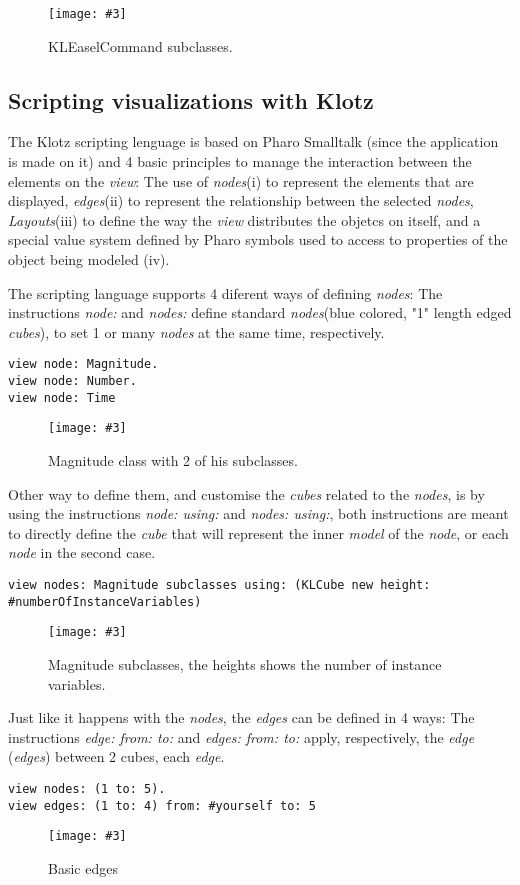 \documentclass[runningheads]{llncs}
\newcommand{\fig}[4]{
	\begin{figure}[#1]
		\centering
		\texttt{[image: \#3]}
		\caption{\label{fig:#3}#4}
	\end{figure}}
\newcommand{\seclabel}[1]{\label{sec:#1}}
\begin{document}
\fig{}{0.5}{figure1.png}{KLEaselCommand subclasses.}


\subsection{Scripting visualizations with Klotz} \seclabel{scripting}
The Klotz scripting lenguage is based on Pharo Smalltalk
(since the application is made on it) and 4 basic principles
to manage the interaction between the elements on the \emph{view}:
The use of \emph{nodes}(i) to represent the elements that are
displayed, \emph{edges}(ii) to represent the relationship between
the selected \emph{nodes}, \emph{Layouts}(iii) to define the way the
\emph{view} distributes the objetcs on itself, and a special value
system defined by Pharo symbols used to access to properties of
the object being modeled (iv).  

The scripting language supports 4 diferent ways of defining \emph{nodes}:
The instructions \emph{node:} and \emph{nodes:} define standard 
\emph{nodes}(blue colored, "1" length edged \emph{cubes}), to set 1 or many 
\emph{nodes} at the same time, respectively.
\begin{lstlisting}
view node: Magnitude.
view node: Number.
view node: Time    
\end{lstlisting}
\fig{}{0.3}{figure2.png}{Magnitude class with 2 of his subclasses.}
Other way to define them, and customise the \emph{cubes} related to the 
\emph{nodes}, is by using the instructions \emph{node: using:} and 
\emph{nodes: using:}, both instructions are meant to directly define 
the \emph{cube} that will represent the inner \emph{model} of the \emph{node}, 
or each \emph{node} in the second case.
\begin{lstlisting}
view nodes: Magnitude subclasses using: (KLCube new height: #numberOfInstanceVariables)    
\end{lstlisting}
\fig{}{0.5}{figure3.png}{Magnitude subclasses, the heights shows the number of instance variables.}

Just like it happens with the \emph{nodes}, the \emph{edges} can be defined in 
4 ways: The instructions \emph{edge: from: to:} and \emph{edges: from: to:} 
apply, respectively, the \emph{edge} (\emph{edges}) between 2 cubes, each \emph{edge}.
\begin{lstlisting}
view nodes: (1 to: 5).	
view edges: (1 to: 4) from: #yourself to: 5 
\end{lstlisting}
\fig{}{0.5}{figure4.png}{Basic edges}
\end{document}
